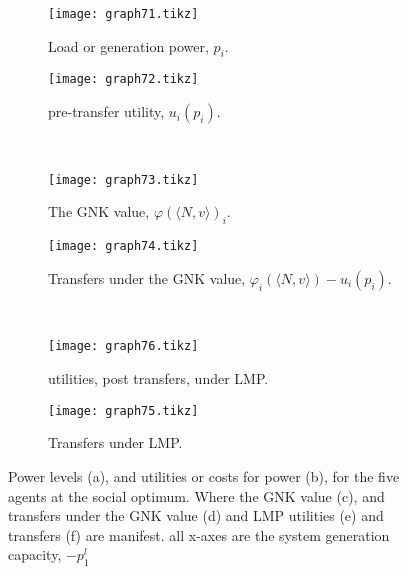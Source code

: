     \begin{figure}[]
	\centering
    \begin{subfigure}[t]{.48\linewidth}
        \centering
        \texttt{[image: graph71.tikz]}
        \caption{\centering Load or generation power, $p_i$.}\label{fig:1a}
    \end{subfigure}
    \begin{subfigure}[t]{.48\linewidth}
        \centering
        \texttt{[image: graph72.tikz]}
        \caption{\centering pre-transfer utility, $u_i(p_i)$.}\label{fig:1b}
    \end{subfigure}\\
    \vspace{5mm}
    \begin{subfigure}[t]{.48\linewidth}
        \centering
        \texttt{[image: graph73.tikz]}
        \caption{\centering The GNK value, $\varphi(\langle N,v \rangle)_i$.}\label{fig:1c}
    \end{subfigure}
    \begin{subfigure}[t]{.48\linewidth}
        \centering
        \texttt{[image: graph74.tikz]}
        \caption{\centering Transfers under the GNK value, $\varphi_i(\langle N,v \rangle)-u_i(p_i)$.}\label{fig:1e}
    \end{subfigure}\\
    \vspace{5mm}
    \begin{subfigure}[t]{.48\linewidth}
        \centering
        \texttt{[image: graph76.tikz]}
        \caption{\centering utilities, post transfers, under LMP.}\label{fig:1f}
    \end{subfigure}
    \begin{subfigure}[t]{.48\linewidth}
        \centering
        \texttt{[image: graph75.tikz]}
        \caption{\centering Transfers under LMP.}\label{fig:1d}
    \end{subfigure}
    \vspace{0.3\baselineskip}
    \caption{Power levels (a), and utilities or costs for power (b), for the five agents at the social optimum. Where the GNK value (c), and transfers under the GNK value (d) and LMP utilities (e) and transfers (f) are manifest. all x-axes are the system generation capacity, $-p_1^l$}\label{fig:1}
\end{figure}